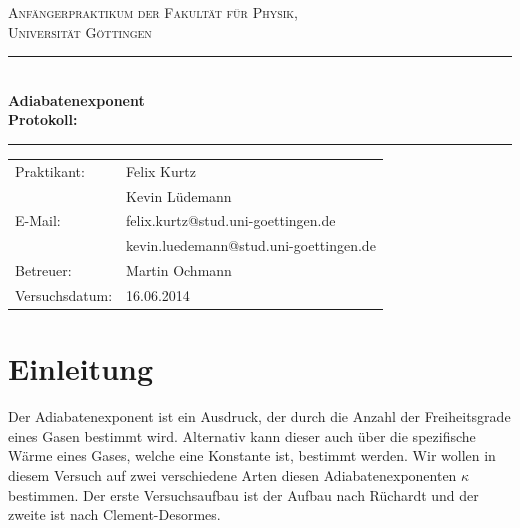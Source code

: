\documentclass[12pt,a4paper,titlepage,headinclude,bibtotoc]{scrartcl}
\begin{document}
\begin{titlepage}
\centering
\textsc{\Large Anfängerpraktikum der Fakultät für
  Physik,\\[1.5ex] Universität Göttingen}

\vspace*{4.2cm}

\rule{\textwidth}{1pt}\\[0.5cm]
{\huge \bfseries
  Adiabatenexponent\\[1.5ex]
  Protokoll:}\\[0.5cm]
\rule{\textwidth}{1pt}

\vspace*{3.0cm}

\begin{Large}
\begin{tabular}{ll}
Praktikant:
 	&  Felix Kurtz\\
	&  Kevin Lüdemann\\

  E-Mail: 
	&  felix.kurtz@stud.uni-goettingen.de\\
	&  kevin.luedemann@stud.uni-goettingen.de\\

 Betreuer: & Martin Ochmann\\
 Versuchsdatum: & 16.06.2014\\
\end{tabular}
\end{Large}

\vspace*{0.8cm}

\begin{Large}
\end{Large}

\end{titlepage}

\tableofcontents

\newpage

\section{Einleitung}
\label{sec:einleitung}
Der Adiabatenexponent ist ein Ausdruck, der durch die Anzahl der Freiheitsgrade eines Gasen bestimmt wird. 
Alternativ kann dieser auch über die spezifische Wärme eines Gases, welche eine Konstante ist, bestimmt werden.
Wir wollen in diesem Versuch auf zwei verschiedene Arten diesen Adiabatenexponenten $\kappa$ bestimmen.
Der erste Versuchsaufbau ist der Aufbau nach Rüchardt und der zweite ist nach Clement-Desormes.
\end{document}
